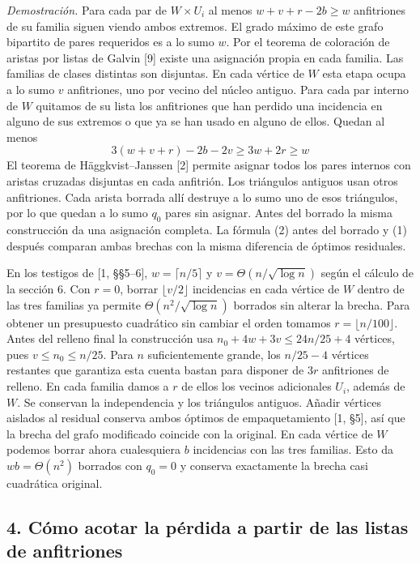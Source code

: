 \documentclass[spanish,11pt,a4paper]{article}
\begin{document}
\emph{Demostración.} Para cada par de \(W\times U_i\) al menos \(w+v+r-2b\ge w\) anfitriones de su familia siguen viendo ambos extremos. El grado máximo de este grafo bipartito de pares requeridos es a lo sumo \(w\). Por el teorema de coloración de aristas por listas de Galvin {[}9{]} existe una asignación propia en cada familia. Las familias de clases distintas son disjuntas. En cada vértice de \(W\) esta etapa ocupa a lo sumo \(v\) anfitriones, uno por vecino del núcleo antiguo. Para cada par interno de \(W\) quitamos de su lista los anfitriones que han perdido una incidencia en alguno de sus extremos o que ya se han usado en alguno de ellos. Quedan al menos \[
3(w+v+r)-2b-2v\ge 3w+2r\ge w
\] El teorema de Häggkvist--Janssen {[}2{]} permite asignar todos los pares internos con aristas cruzadas disjuntas en cada anfitrión. Los triángulos antiguos usan otros anfitriones. Cada arista borrada allí destruye a lo sumo uno de esos triángulos, por lo que quedan a lo sumo \(q_0\) pares sin asignar. Antes del borrado la misma construcción da una asignación completa. La fórmula (2) antes del borrado y (1) después comparan ambas brechas con la misma diferencia de óptimos residuales.

En los testigos de {[}1, §§5--6{]}, \(w=\lceil n/5\rceil\) y \(v=\Theta(n/\sqrt{\log n})\) según el cálculo de la sección 6. Con \(r=0\), borrar \(\lfloor v/2\rfloor\) incidencias en cada vértice de \(W\) dentro de las tres familias ya permite \(\Theta(n^2/\sqrt{\log n})\) borrados sin alterar la brecha. Para obtener un presupuesto cuadrático sin cambiar el orden tomamos \(r=\lfloor n/100\rfloor\). Antes del relleno final la construcción usa \(n_0+4w+3v\le24n/25+4\) vértices, pues \(v\le n_0\le n/25\). Para \(n\) suficientemente grande, los \(n/25-4\) vértices restantes que garantiza esta cuenta bastan para disponer de \(3r\) anfitriones de relleno. En cada familia damos a \(r\) de ellos los vecinos adicionales \(U_i\), además de \(W\). Se conservan la independencia y los triángulos antiguos. Añadir vértices aislados al residual conserva ambos óptimos de empaquetamiento {[}1, §5{]}, así que la brecha del grafo modificado coincide con la original. En cada vértice de \(W\) podemos borrar ahora cualesquiera \(b\) incidencias con las tres familias. Esto da \(wb=\Theta(n^2)\) borrados con \(q_0=0\) y conserva exactamente la brecha casi cuadrática original.

\subsection{4. Cómo acotar la pérdida a partir de las listas de anfitriones}\label{cuxf3mo-acotar-la-puxe9rdida-a-partir-de-las-listas-de-anfitriones}
\end{document}
